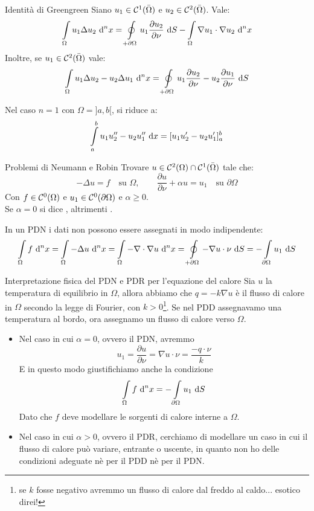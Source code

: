 \documentclass{book}
\begin{document}
\begin{theorem}{Identità di Green}{green}
    Siano $u_1 \in \mathcal{C}^1(\bar{\Omega})$ e $u_2 \in \mathcal{C}^2(\bar{\Omega})$. Vale:
    \[\int\limits_{\Omega} u_1\Delta u_2 \text{ d}^n x = \oint\limits_{+\partial\Omega} u_1 \frac{\partial u_2}{\partial \nu}\text{ d} S - \int\limits_\Omega \nabla u_1 \cdot \nabla u_2 \text{ d}^n x \]
    Inoltre, se $u_1 \in \mathcal{C}^2(\bar{\Omega})$ vale:
    \[\int\limits_\Omega u_1\Delta u_2 - u_2 \Delta u_1 \text{ d}^n x = \oint\limits_{+\partial\Omega} u_1 \frac{\partial u_2}{\partial \nu} - u_2 \frac{\partial u_1}{\partial \nu} \text{ d} S\]
\end{theorem}

\begin{remark}{}{}
    Nel caso $n=1$ con $\Omega =]a,b[$, si riduce a:
    \[\int\limits_a^b u_1 u_2'' - u_2 u_1'' \text{ d} x = [u_1u_2' - u_2u_1']_a^b\]
\end{remark}

\begin{definition}{Problemi di Neumann e Robin}{}
    Trovare $u \in \mathcal{C}^2(\Omega)\cap\mathcal{C}^1(\bar{\Omega})$ tale che:
    \[-\Delta u = f \quad \text{su }\Omega, \qquad \frac{\partial u}{\partial\nu} + \alpha u = u_1 \quad\text{su }\partial\Omega\]
    Con $f \in \mathcal{C}^0(\Omega)$ e $u_1 \in \mathcal{C}^0(\partial\Omega)$ e $\alpha \ge 0$.\\
    Se $\alpha = 0$ si dice , altrimenti .
\end{definition}

\begin{remark}{}{}
    In un PDN i dati non possono essere assegnati in modo indipendente:
    \[\int\limits_\Omega f\text{ d}^n x = \int\limits_\Omega -\Delta u \text{ d}^n x = \int\limits_\Omega -\nabla \cdot \nabla u \text{ d}^n x = \oint\limits_{+\partial \Omega} - \nabla u \cdot \nu \text{ d} S = -\int\limits_{\partial \Omega} u_1 \text{ d} S\]
\end{remark}

\begin{remark}{Interpretazione fisica del PDN e PDR per l'equazione del calore}{}
    Sia $u$ la temperatura di equilibrio in $\Omega$, allora abbiamo che  $q = -k\nabla u $ è il flusso di calore in $\Omega$ secondo la legge di Fourier, con $k>0$\footnote{se $k$ fosse negativo avremmo un flusso di calore dal freddo al caldo... esotico direi!}. Se nel PDD assegnavamo una temperatura al bordo, ora assegnamo un flusso di calore verso $\Omega$.\begin{itemize}
        \item Nel caso in cui $\alpha=0$, ovvero il PDN, avremmo \[u_1 = \frac{\partial u}{\partial \nu} = \nabla u \cdot \nu = \frac{-q\cdot \nu}{k}\] E in questo modo giustifichiamo anche la condizione \[\int\limits_\Omega f\text{ d}^n x =-\int\limits_{\partial \Omega} u_1 \text{ d} S\] Dato che $f$ deve modellare le sorgenti di calore interne a $\Omega$.
        \item Nel caso in cui $\alpha > 0$, ovvero il PDR, cerchiamo di modellare un caso in cui il flusso di calore può variare, entrante o uscente, in quanto non ho delle condizioni adeguate nè per il PDD nè per il PDN.
    \end{itemize}
\end{remark}
\end{document}
